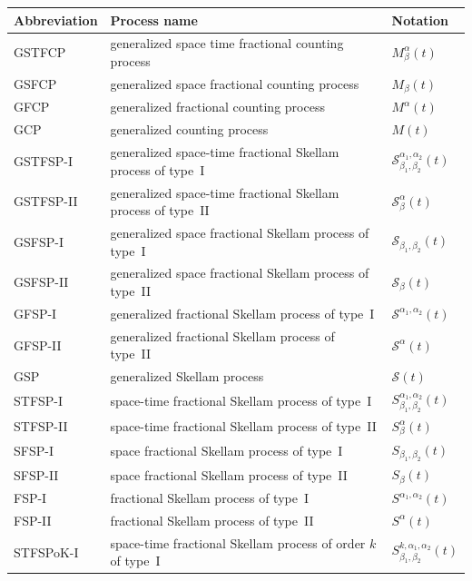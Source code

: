 \documentclass[11pt,oneside,reqno]{amsart}
\theoremstyle{definition}
\theoremstyle{remarkstyle}
\begin{document}
\begin{table}[H]
\centering
\label{tab:abbreviations}
\begin{tabular}{lll}
\toprule
\textbf{Abbreviation} & \textbf{Process name} & \textbf{Notation} \\
\midrule
GSTFCP & generalized space time fractional counting process & $ M_{\beta}^{\alpha}(t)$ \\
GSFCP & generalized space fractional counting process & $ M_{\beta}(t)$ \\
GFCP & generalized fractional counting process & $ M^{\alpha}(t)$ \\
GCP & generalized counting process & $ M(t)$ \\
GSTFSP-I & generalized space-time fractional Skellam process of type~I & $\mathcal{S}_{\beta_1,\beta_2}^{\alpha_1,\alpha_2}(t)$\\
GSTFSP-II & generalized 
space-time fractional Skellam process of type~II & $\mathcal{S}_{\beta}^{\alpha}(t)$\\
GSFSP-I & generalized space fractional Skellam process of type~I & $\mathcal{S}_{\beta_1,\beta_2}(t)$\\
GSFSP-II & generalized 
space fractional Skellam process of type~II & $\mathcal{S}_{\beta}(t)$\\
GFSP-I & generalized fractional Skellam process of type~I & $\mathcal{S}^{\alpha_1,\alpha_2}(t)$\\
GFSP-II & generalized fractional Skellam process of type~II & $\mathcal{S}^{\alpha}(t)$\\
GSP & generalized Skellam process & $\mathcal{S}(t)$\\
STFSP-I & space-time fractional Skellam process of type~I & $S_{\beta_1,\beta_2}^{\alpha_1,\alpha_2}(t)$\\
STFSP-II & space-time fractional Skellam process of type~II & $S_{\beta}^{\alpha}(t)$\\
SFSP-I & space fractional Skellam process of type~I & $S_{\beta_1,\beta_2}(t)$\\
SFSP-II & space fractional Skellam process of type~II & $S_{\beta}(t)$\\
FSP-I & fractional Skellam process of type~I & $S^{\alpha_1,\alpha_2}(t)$\\
FSP-II & fractional Skellam process of type~II & $S^{\alpha}(t)$\\
STFSPoK-I & space-time fractional Skellam process of order $k$ of type~I & $S^{k,\alpha_1,\alpha_2}_{\beta_1,\beta_2}(t)$\\

\end{tabular}
\end{table}
\end{document}
